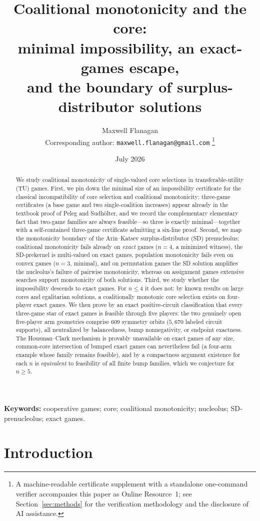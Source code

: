 \documentclass[11pt]{article}
\title{Coalitional monotonicity and the core:\\
minimal impossibility, an exact-games escape,\\
and the boundary of surplus-distributor solutions}
\author{Maxwell Flanagan\\[2pt]
\normalsize Corresponding author: \texttt{maxwell.flanagan@gmail.com}%
\thanks{A machine-readable certificate supplement with a standalone
one-command verifier accompanies this paper as Online Resource~1; see
Section~\ref{sec:methods} for the verification methodology and the
disclosure of AI assistance.}}
\date{July 2026}
\begin{document}
\maketitle

\begin{abstract}
We study coalitional monotonicity of single-valued core selections in
transferable-utility (TU) games. First, we pin down the minimal size of an
impossibility certificate for the classical incompatibility of core
selection and coalitional monotonicity: three-game certificates (a base
game and two single-coalition increases) appear already in the textbook
proof of Peleg and Sudh\"olter, and we record the complementary elementary
fact that two-game families are always feasible---so three is exactly
minimal---together with a self-contained three-game certificate admitting a
six-line proof. Second, we map
the monotonicity boundary of the Arin--Katsev surplus-distributor (SD)
prenucleolus: coalitional monotonicity fails already on \emph{exact} games
($n=4$, a minimized witness), the SD-prekernel is multi-valued on exact
games, population monotonicity fails even on convex games ($n=3$, minimal),
and on permutation games the SD solution amplifies the nucleolus's failure
of pairwise monotonicity, whereas on assignment games extensive searches
support monotonicity of both solutions. Third, we study whether the
impossibility descends to exact games. For $n\le4$ it does not: by known
results on large cores and egalitarian solutions, a coalitionally monotonic
core selection exists on four-player exact games. We then prove by an exact
positive-circuit classification that every three-game star of exact games is
feasible through five players: the two genuinely open five-player arm
geometries comprise $609$ symmetry orbits ($5{,}670$ labeled circuit
supports), all neutralized by balancedness, bump nonnegativity, or endpoint
exactness. The
Housman--Clark mechanism is provably unavailable on exact games of any size,
common-core intersection of bumped exact games can nevertheless fail (a
four-arm example whose family remains feasible), and by a compactness
argument existence for each $n$ is \emph{equivalent} to feasibility of all
finite bump families, which we conjecture for $n\ge5$.
\end{abstract}

\medskip
\noindent\textbf{Keywords:} cooperative games; core; coalitional
monotonicity; nucleolus; SD-prenucleolus; exact games.


\section{Introduction}
\end{document}
